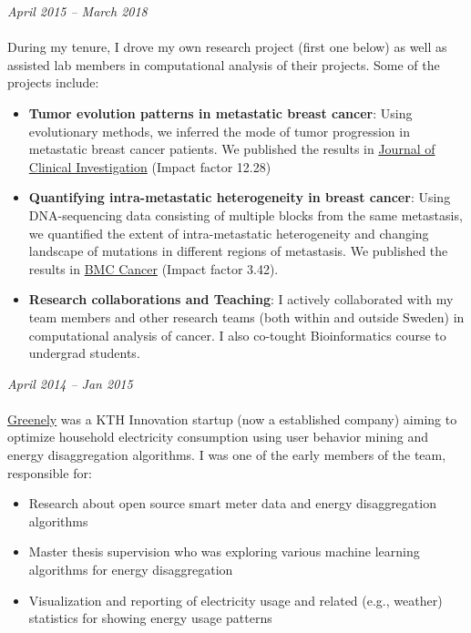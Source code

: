 \documentclass[margin, 10pt]{res} %
\begin{document}
\begin{resume}
{\sl \textbf{}} \hfill \textit{April 2015 -- March 2018} \\
{\color{RubineRed}{Radiumhemmet, Karolinska University Hospital}} \\
During my tenure, I drove my own research project (first one below) as well as assisted lab members in computational analysis of their projects. Some of the projects include:
\begin{itemize}
\item \textbf{Tumor evolution patterns in metastatic breast cancer}: Using evolutionary methods, we inferred the mode of tumor progression in metastatic breast cancer patients. We published the results in \href{https://www.jci.org/articles/view/96149}{Journal of Clinical Investigation} (Impact factor 12.28)
\item \textbf{Quantifying intra-metastatic heterogeneity in breast cancer}: Using DNA-sequencing data consisting of multiple blocks from the same metastasis, we quantified the extent of intra-metastatic heterogeneity and changing landscape of mutations in different regions of metastasis. We published the results in \href{https://bmccancer.biomedcentral.com/articles/10.1186/s12885-017-3815-2}{BMC Cancer} (Impact factor 3.42).
\item \textbf{Research collaborations and Teaching}: I actively collaborated with my team members and other research teams (both within and outside Sweden) in computational analysis of cancer. I also co-tought Bioinformatics course to undergrad students.
\end{itemize}


{\sl \textbf{}} \hfill \textit{April 2014 -- Jan 2015} \\
{\color{RubineRed}{Greenely, Sweden}} \\
\href{http://www.greenely.com}{Greenely} was a KTH Innovation startup (now a established company) aiming to optimize household electricity consumption using user behavior mining and energy disaggregation algorithms. 
I was one of the early members of the team, responsible for:
\begin{itemize} 
\item Research about open source smart meter data and energy disaggregation algorithms
\item Master thesis supervision who was exploring various machine learning algorithms for energy disaggregation 
\item Visualization and reporting of electricity usage and related (e.g., weather) statistics for showing energy usage patterns
\end{itemize} 


\end{resume}
\end{document}
